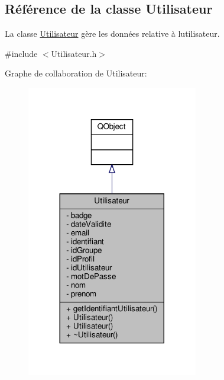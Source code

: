 \hypertarget{class_utilisateur}{}\subsection{Référence de la classe Utilisateur}
\label{class_utilisateur}


La classe \hyperlink{class_utilisateur}{Utilisateur} gère les données relative à l\textquotesingle{}utilisateur.  




{\ttfamily \#include $<$Utilisateur.\+h$>$}



Graphe de collaboration de Utilisateur\+:
\nopagebreak
\begin{figure}[H]
\begin{center}
\leavevmode
\includegraphics[width=212pt]{class_utilisateur__coll__graph}
\end{center}
\end{figure}
